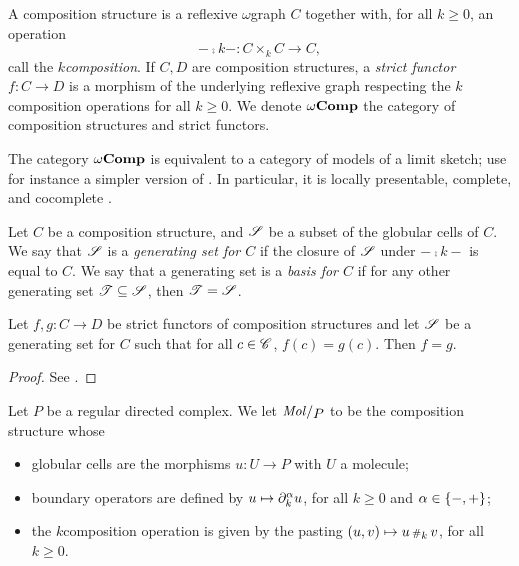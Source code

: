 \begin{dfn} 
    A composition structure is a reflexive \( \omega \)\nbd graph \( C \) together with, for all \( k \geq 0 \), an operation
    \begin{equation*}
        - \comp{k} - \colon C \times_k C \to C,
    \end{equation*}
    call the \emph{\( k \)\nbd composition}.
    If \( C, D \) are composition structures, a \emph{strict functor} \( f \colon C \to D \) is a morphism of the underlying reflexive graph respecting the \( k \)\nbd composition operations for all \( k \geq 0 \).
    We denote \( \omega\mathbf{Comp} \) the category of composition structures and strict functors.
\end{dfn}

\begin{rmk}
    The category \( \omega\mathbf{Comp} \) is equivalent to a category of models of a limit sketch; use for instance a simpler version of \cite[Proposition 14.2.4]{ara2025polygraphs}.
    In particular, it is locally presentable, complete, and cocomplete \cite{adamek1994locally}.
\end{rmk}

\begin{dfn} 
    Let \( C \) be a composition structure, and \( \mathscr{S} \) be a subset of the globular cells of \( C \).
    We say that \( \mathscr{S} \) is a \emph{generating set for \( C \)} if the closure of \( \mathscr{S} \) under \( - \comp{k} - \) is equal to \( C \).
    We say that a generating set is a \emph{basis for \( C \)} if for any other generating set \( \mathscr{T} \subseteq \mathscr{S} \), then \( \mathscr{T} = \mathscr{S} \).
\end{dfn}

\begin{lem}\label{lem:strict_functor_determined_by_basis}
    Let \( f, g \colon C \to D \) be strict functors of composition structures and let \( \mathscr{S} \) be a generating set for \( C \) such that for all \( c \in \mathscr{C} \), \( f(c) = g(c) \).
    Then \( f = g \).
\end{lem}
\begin{proof}
    See \cite[Lemma 5.1.23]{hadzihasanovic2024combinatorics}.
\end{proof}

\begin{dfn} 
    Let \( P \) be a regular directed complex.
    We let \( \molecin{P} \) to be the composition structure whose
    \begin{itemize}
        \item globular cells are the morphisms \( u \colon U \to P \) with \( U \) a molecule;
        \item boundary operators are defined by \( u \mapsto \partial_{k}^{ \alpha} u \), for all \( k \geq 0 \) and \( \alpha \in \left\{ {-, +} \right\} \);
        \item the \( k \)\nbd composition operation is given by the pasting \( (u, v) \mapsto u \,{\scriptstyle\#}_{k}\, v \), for all \( k \geq 0 \). 
    \end{itemize}    
\end{dfn}

